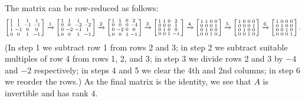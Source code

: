  The matrix can be row-reduced as follows:
 {\tiny \[
  \left[\begin{smallmatrix}  1 &  1 &  1 &  1 \\
        1 &  1 & -1 & -1 \\
        1 & -1 &  0 &  0 \\
        0 &  0 &  1 & -1 \end{smallmatrix}\right] \xrightarrow{1}
  \left[\begin{smallmatrix}  1 &  1 &  1 &  1 \\
        0 &  0 & -2 & -2 \\
        0 & -2 & -1 &  1 \\
        0 &  0 &  1 & -1 \end{smallmatrix}\right] \xrightarrow{2}
  \left[\begin{smallmatrix}  1 &  1 &  0 &  2 \\
        0 &  0 &  0 & -4 \\
        0 & -2 &  0 &  0 \\
        0 &  0 &  1 & -1 \end{smallmatrix}\right] \xrightarrow{3}
  \left[\begin{smallmatrix}  1 &  1 &  0 &  2 \\
        0 &  0 &  0 &  1 \\
        0 &  1 &  0 &  0 \\
        0 &  0 &  1 & -1 \end{smallmatrix}\right] \xrightarrow{4}
  \left[\begin{smallmatrix}  1 &  1 &  0 &  0 \\
        0 &  0 &  0 &  1 \\
        0 &  1 &  0 &  0 \\
        0 &  0 &  1 &  0 \end{smallmatrix}\right] \xrightarrow{5}
  \left[\begin{smallmatrix}  1 &  0 &  0 &  0 \\
        0 &  0 &  0 &  1 \\
        0 &  1 &  0 &  0 \\
        0 &  0 &  1 &  0 \end{smallmatrix}\right] \xrightarrow{6}
  \left[\begin{smallmatrix}  1 &  0 &  0 &  0 \\
        0 &  1 &  0 &  0 \\
        0 &  0 &  1 &  0 \\
        0 &  0 &  0 &  1 \end{smallmatrix}\right].
 \]}
 (In step 1 we subtract row 1 from rows 2 and 3; in step 2
 we subtract suitable multiples of row 4 from rows 1, 2, and
 3; in step 3 we divide rows 2 and 3 by $-4$ and $-2$
 respectively; in steps 4 and 5 we clear the 4th and 2nd
 columns; in step 6 we reorder the rows.)  As the final
 matrix is the identity, we see that $A$ is invertible and
 has rank $4$.
\EndDeferredSolution


